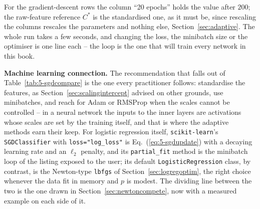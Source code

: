 For the gradient-descent rows the column ``20 epochs'' holds the value
after $200$; the raw-feature reference $C^{*}$ is the standardised one, as
it must be, since rescaling the columns rescales the parameters and
nothing else, Section~\ref{sec:adaptive}.  The whole run takes a few
seconds, and changing the loss, the minibatch size or the optimiser is one
line each -- the loop is the one that will train every network in this
book.

\begin{notebox}
\textbf{Machine learning connection.}  The recommendation that falls out of
Table~\ref{tab:5-sgdcompare} is the one every practitioner follows:
standardise the features, as Section~\ref{sec:scalingintercept} advised on
other grounds, use minibatches, and reach for Adam or RMSProp when the
scales cannot be controlled -- in a neural network the inputs to the inner
layers are activations whose scales are set by the training itself, and
that is where the adaptive methods earn their keep.  For logistic
regression itself, \texttt{scikit-learn}'s \texttt{SGDClassifier} with
\texttt{loss="log\_loss"} is Eq.~(\ref{eq:5-sgdupdate}) with a decaying
learning rate and an $\ell_2$ penalty, and its \texttt{partial\_fit} method
is the minibatch loop of the listing exposed to the user; its default
\texttt{LogisticRegression} class, by contrast, is the Newton-type
\texttt{lbfgs} of Section~\ref{sec:logregoptim}, the right choice whenever
the data fit in memory and $p$ is modest.  The dividing line between the
two is the one drawn in Section~\ref{sec:newtoncompete}, now with a
measured example on each side of it.
\end{notebox}

